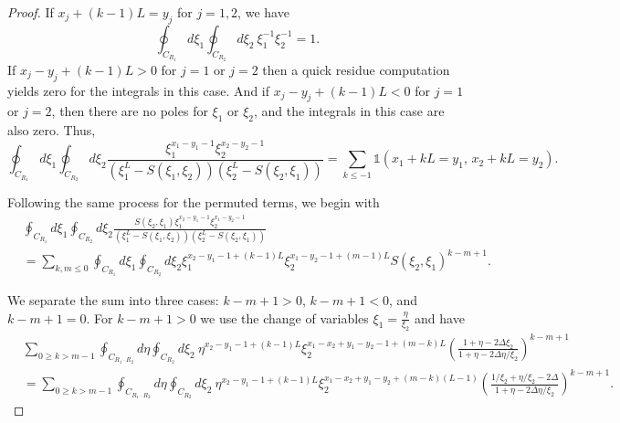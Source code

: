 \documentclass[a4paper,11pt]{article}
\theoremstyle{definition}
\begin{document}
\begin{proof}
If $x_j + (k-1)L = y_j$ for $j=1,2$, we have 
\begin{equation}
    \oint_{C_{R_1}}d\xi_1\oint_{C_{R_2}}d\xi_2  \ \xi_1^{-1}\xi_2^{-1} = 1.
\end{equation}
If $x_j - y_j + (k-1)L>0$ for $j=1$ or $j=2$ then a quick residue computation yields zero for the integrals in this case. And if $x_j-y_j+(k-1)L<0$ for $j=1$ or $j=2$, then there are no poles for $\xi_1$ or $\xi_2$, and the integrals in this case are also zero. Thus, 
\begin{equation}
    \oint_{C_{R_1}}d\xi_1\oint_{C_{R_2}}d\xi_2 \frac{\xi_1^{x_1-y_1-1}\xi_2^{x_2-y_2-1}}{\left(\xi_1^L - S(\xi_1,\xi_2) \right)\left(\xi_2^L - S(\xi_2,\xi_1) \right)}=\sum_{k\leq -1}\mathds{1}\left(x_1+kL=y_1, \, x_2+kL=y_2\right).
\end{equation}

Following the same process for the permuted terms, we begin with
\begin{equation}
    \begin{split}
        &\oint_{C_{R_1}}d\xi_1\oint_{C_{R_2}}d\xi_2 \frac{S(\xi_2,\xi_1)\xi_1^{x_2-y_1-1}\xi_2^{x_1-y_2-1}}{\left(\xi_1^L - S(\xi_1,\xi_2) \right)\left(\xi_2^L - S(\xi_2,\xi_1) \right)} \\
        &= \sum_{k,m\leq 0} \oint_{C_{R_1}}d\xi_1\oint_{C_{R_2}}d\xi_2 \xi_1^{x_2-y_1-1+(k-1)L}\xi_2^{x_1-y_2-1+(m-1)L}S(\xi_2,\xi_1)^{k-m+1}.
    \end{split}
\end{equation}

We separate the sum into three cases: $k-m+1>0$, $k-m+1<0$, and $k-m+1 = 0$. For $k-m+1>0$ we use the change of variables $\xi_1=\frac{\eta}{\xi_2}$ and have 
\begin{equation}
    \begin{split}
        &\sum_{0\geq k>m-1} \oint_{C_{R_1 \cdot R_2}}d\eta\oint_{C_{R_2}}d\xi_2 \ \eta^{x_2-y_1-1+(k-1)L}\xi_2^{x_1-x_2+y_1-y_2-1+(m-k)L}\left(\frac{1+\eta-2\Delta\xi_2}{1+\eta-2\Delta\eta/\xi_2}\right)^{k-m+1} \\
        &=\sum_{0\geq k>m-1}\oint_{C_{R_1\cdot R_2}}d\eta\oint_{C_{R_2}}d\xi_2 \ \eta^{x_2-y_1-1+(k-1)L}\xi_2^{x_1-x_2+y_1-y_2+(m-k)(L-1)}\left(\frac{1/\xi_2+\eta/\xi_2-2\Delta}{1+\eta-2\Delta\eta/\xi_2}\right)^{k-m+1}.
    \end{split}
\end{equation}


\end{proof}
\end{document}
